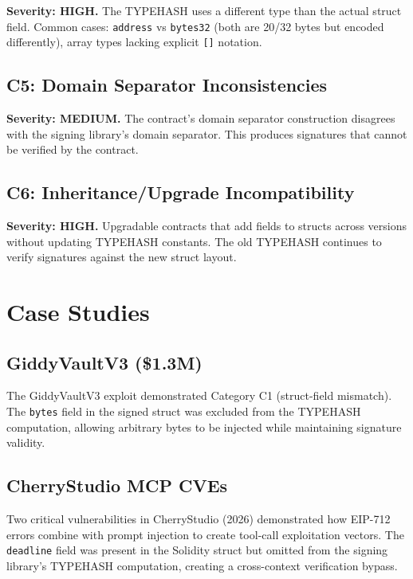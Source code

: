 \documentclass[conference]{IEEEtran}
\begin{document}
\textbf{Severity: HIGH.} The TYPEHASH uses a different type than the actual struct field. Common cases: \texttt{address} vs \texttt{bytes32} (both are 20/32 bytes but encoded differently), array types lacking explicit \texttt{[]} notation.

\subsection{C5: Domain Separator Inconsistencies}

\textbf{Severity: MEDIUM.} The contract's domain separator construction disagrees with the signing library's domain separator. This produces signatures that cannot be verified by the contract.

\subsection{C6: Inheritance/Upgrade Incompatibility}

\textbf{Severity: HIGH.} Upgradable contracts that add fields to structs across versions without updating TYPEHASH constants. The old TYPEHASH continues to verify signatures against the new struct layout.

\section{Case Studies}

\subsection{GiddyVaultV3 (\$1.3M)}

The GiddyVaultV3 exploit demonstrated Category C1 (struct-field mismatch). The \texttt{bytes} field in the signed struct was excluded from the TYPEHASH computation, allowing arbitrary bytes to be injected while maintaining signature validity.

\subsection{CherryStudio MCP CVEs}

Two critical vulnerabilities in CherryStudio (2026) demonstrated how EIP-712 errors combine with prompt injection to create tool-call exploitation vectors. The \texttt{deadline} field was present in the Solidity struct but omitted from the signing library's TYPEHASH computation, creating a cross-context verification bypass.
\end{document}
